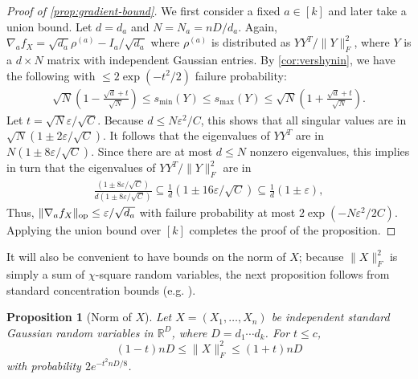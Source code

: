 \documentclass[aos]{imsart}
\newtheorem{prop}[theorem]{Proposition}
\theoremstyle{definition}
\numberwithin{equation}{section}
\DeclareMathOperator{\op}{op}
\DeclarePairedDelimiter{\norm}{\lVert}{\rVert}
\newcommand{\R}{{\mathbb{R}}}
\newcommand{\eps}{\varepsilon}
\newcommand{\cN}{\mathcal{N}}
\newcommand{\rv}{X}
\begin{document}
\begin{proof}[Proof of \cref{prop:gradient-bound}]
We first consider a fixed $a\in[k]$ and later take a union bound.
Let $d = d_a$ and $N = N_a = n D/d_a$.
Again, $\nabla_a f_{\rv} = \sqrt{d_a} \rho^{(a)} - I_a/\sqrt{d_a}$ where $\rho^{(a)}$ is distributed as $Y Y^T/\|Y\|_F^2$, where $Y$ is a $d \times N$ matrix with independent Gaussian entries.
By \cref{cor:vershynin}, we have the following with $\leq 2 \exp(-t^2/2)$ failure probability:
\begin{align*}
  \sqrt{N} \left( 1 -  \frac{\sqrt{d} + t }{\sqrt{N}}  \right)\leq s_{\min}(Y) \leq s_{\max}(Y) \leq  \sqrt{N} \left( 1 + \frac{\sqrt{d} + t }{\sqrt{N}} \right).
\end{align*}
Let $t = \sqrt{N} \eps / \sqrt{C}$.
Because $d \leq N \eps^2 / C$, this shows that all singular values are in $\sqrt{N} \left( 1 \pm 2\eps/\sqrt{C} \right)$.
It follows that the eigenvalues of $YY^T$ are in $N \left( 1 \pm 8\eps/\sqrt{C} \right)$.
Since there are at most $d \leq N$ nonzero eigenvalues, this implies in turn that the eigenvalues of $Y Y^T/\|Y\|_F^2$ are in
\begin{align*}
\frac {\left( 1 \pm 8\eps/\sqrt{C} \right)} {d \left( 1 \pm 8\eps/\sqrt{C} \right)} \subseteq \frac1d \left( 1 \pm 16\eps/\sqrt{C} \right) \subseteq \frac1d \left( 1 \pm \eps \right),
\end{align*}
Thus,
$\norm{\nabla_a f_{\rv}}_{\op} \leq \eps/\sqrt{d_a}$
with failure probability at most $2 \exp(-N \eps^2/2C)$.
Applying the union bound over $[k]$ completes the proof of the proposition.
\end{proof}

It will also be convenient to have bounds on the norm of $X$; because $\|X\|_F^2$ is simply a sum of $\chi$-square random variables, the next proposition follows from standard concentration bounds (e.g. \cite{W19}).
\begin{prop}[Norm of $X$]\label{prp:xnorm}
Let $\rv = (\rv_1,\dots,\rv_n)$ be independent standard Gaussian random variables in $\R^D$, where $D=d_1\cdots{}d_k$. For $t \leq c$,
$$ (1 - t) nD \leq \|X\|_F^2 \leq (1 + t)nD$$ with probability $2e^{-t^2 nD/8}$.
\end{prop}
\end{document}
